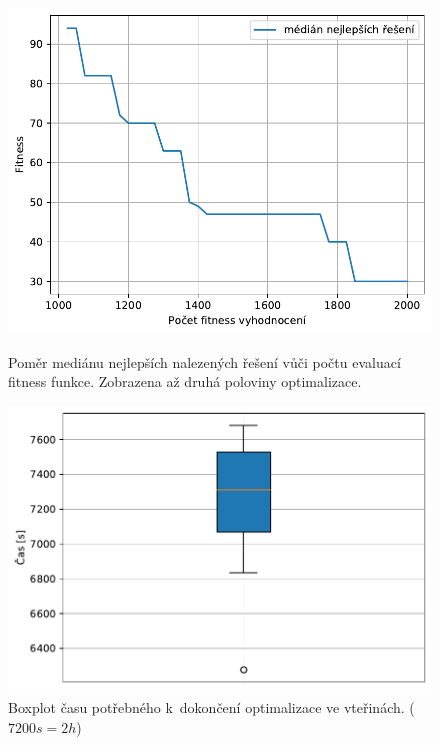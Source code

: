 \begin{figure}[H]
\begin{minipage}[t]{0.475\linewidth}
	\includegraphics[width=\textwidth]{obrazky-figures/statistics/HIFU/blob/4/DE/bestsToFitness_1.pdf}
	\caption{Poměr mediánu nejlepších nalezených řešení vůči počtu evaluací fitness funkce. Zobrazena až druhá poloviny optimalizace.}
	\label{fg:hifu:de:fitPerf}
\end{minipage}
\hfill
\begin{minipage}[t]{0.475\linewidth}
\includegraphics[width=\linewidth]{obrazky-figures/statistics/HIFU/blob/4/DE/timeBoxplot_WithOutliers.pdf}
\caption{Boxplot času potřebného k~dokončení optimalizace ve vteřinách. ($7200s = 2h$)}
\label{fg:hifu:de:time}
\end{minipage}
\end{figure}


